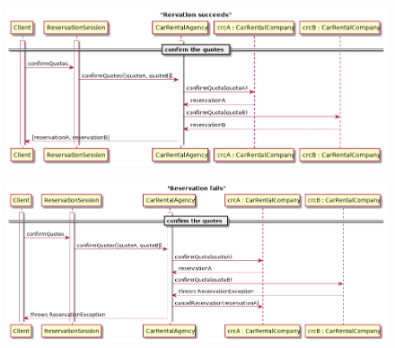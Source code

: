 \documentclass{ds-report}
\begin{document}
\clearpage
	\begin{landscape}
		\begin{figure}
			\centering
			\includegraphics[width=\paperwidth]{../diagrams/sequenceDiagrams/reservationSucceeds.png}
		\end{figure}
	\end{landscape}
\clearpage
	\begin{landscape}
		\begin{figure}
			\centering
			\includegraphics[width=\paperwidth]{../diagrams/sequenceDiagrams/reservationFails.png}
		\end{figure}
	\end{landscape}
\end{document}
